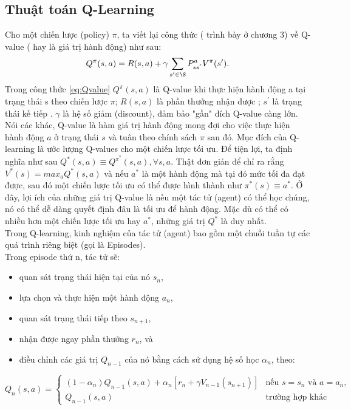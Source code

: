 \subsection{Thuật toán Q-Learning}
Cho một chiến lược (policy) $\pi$, ta viết lại công thức ( trình bày ở chương 3) về Q-value ( hay là giá trị hành động)
như sau:
\begin{equation} 
    \label{eq:Qvalue}
    Q^{\pi}(s,a) = R(s,a) + \gamma \sum_{s'\in \S} P_{ss^{'}}^{a}V^{\pi}(s').
\end{equation}
Trong công thức \ref{eq:Qvalue} $Q^{\pi}(s,a)$ là Q-value khi thực hiện hành động a tại trạng thái s theo chiến lược $\pi$; $R(s,a)$ là phần thưởng nhận được ; $s^{'}$ là trạng thái kế tiếp
. $\gamma$ là hệ số giảm (discount), đảm bảo "gần" đích Q-value càng lớn.\\
Nói các khác, Q-value là hàm giá trị hành động mong đợi cho việc thực hiện hành động $a$ ở trạng thái $s$ và tuân theo chính sách $\pi$ sau đó. 
 Mục đích của Q-learning là ước lượng Q-values cho một chiến lược tối ưu. Để tiện lợi, ta định nghĩa như sau 
 $Q^{*}(s,a) \equiv Q^{\pi^{*}}(s,a), \forall s, a$. Thật đơn giản để chỉ ra rằng
  $V^{*}(s) = max_{a} Q^{*}(s,a)$ và nếu $a^{*}$ là một hành động mà tại đó
  mức tối đa đạt được, sau đó một chiến lược tối ưu có thể được hình thành như $\pi^{*}(s) \equiv a^{*}$.
  Ở đây, lợi ích của những giá trị Q-value là nếu một tác tử (agent) có thể học chúng, nó có thể 
  dễ dàng quyết định đâu là tối ưu để hành động. Mặc dù có thể có nhiều hơn một chiến lược tối ưu hay 
  $a^{*}$, những giá trị $Q^{*}$ là duy nhất.\\
  \indent Trong Q-learning,  kinh nghiệm của tác tử (agent) bao gồm một chuỗi tuần tự các quá trình riêng biệt (gọi là Episodes).\\
  Trong episode thứ n, tác tử sẽ:
\begin{itemize}
    \item quan sát trạng thái hiện tại của nó $s_n$,
    \item lựa chọn và thực hiện một hành động $a_n$,
    \item quan sát trạng thái tiếp theo $s_{n+1}$,
    \item nhận được ngay phần thưởng $r_n$, và
    \item điều chỉnh các giá trị $Q_{n-1}$ của nó bằng cách sử dụng hệ số học $\alpha_{n}$, theo:
\end{itemize}
\begin{equation} 
Q_{n}(s,a) =  \begin{cases}
    (1-\alpha_n)Q_{n-1}(s,a) + \alpha_{n}[r_n + \gamma V_{n-1}(s_{n+1})] &\text{nếu } s = s_n \text{ và } a = a_n,\\
    Q_{n-1}(s, a) &\text{trường hợp khác}
\end{cases}   
\end{equation}
